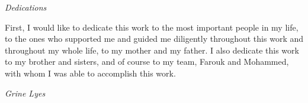 \begin{center}
\Huge{\emph{Dedications}}
\end{center}

\vspace{1cm}

First, I would like to dedicate this work to the most important people in my life, to the ones who supported me and guided me diligently throughout this work and throughout my whole life, to my mother and my father. I also dedicate this work to my brother and sisters, and of course to my team, Farouk and Mohammed, with whom I was able to accomplish this work.


\vspace{3cm}
\begin{flushright}
	\textit{Grine Lyes}
\end{flushright}